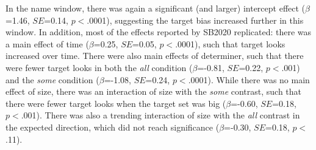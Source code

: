 \documentclass[10pt,letterpaper]{article}
\begin{document}
In the name window, there was again a significant (and larger) intercept effect ($\beta$=1.46, $SE$=0.14, $p<$.0001), suggesting the target bias increased further in this window. In addition, most of the effects reported by SB2020 replicated: there was a main effect of time  ($\beta$=0.25, $SE$=0.05, $p<$.0001), such that target looks increased over time. There were also main effects of determiner, such that there were fewer target looks in both the \emph{all} condition  ($\beta$=-0.81, $SE$=0.22, $p<$.001) and the \emph{some} condition   ($\beta$=-1.08, $SE$=0.24, $p<$.0001). While there was no main effect of size, there was an interaction of size with the \emph{some} contrast, such that there were fewer target looks when the target set was big   ($\beta$=-0.60, $SE$=0.18, $p<$.001). There was also a trending interaction of size with the \emph{all} contrast in the expected direction, which did not reach significance ($\beta$=-0.30, $SE$=0.18, $p<$.11).


\end{document}
